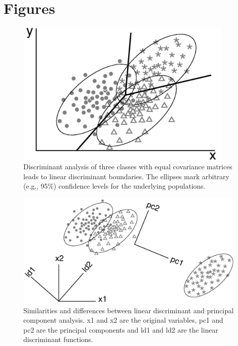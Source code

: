 \section*{Figures}

\begin{figure}[htbp]
  \centering
  \label{fig:linDisc}
  \includegraphics[width=400]{figures/discriminant.jpg}
  \caption[Linear discriminant analysis]{
Discriminant analysis of three  classes with equal covariance matrices
leads to  linear discriminant boundaries. The  ellipses mark arbitrary
(e.g., 95\%) confidence levels for the underlying populations.}
\end{figure}

\begin{figure}[htbp]
  \centering
  \includegraphics[width=600]{figures/PCAvsLDA.jpg}
  \caption[The difference between PCA and LDA]
{Similarities   and  differences   between  linear   discriminant  and
principal component  analysis.  x1 and x2 are  the original variables,
pc1  and pc2  are the  principal components  and ld1  and ld2  are the
linear discriminant functions.}
  \label{fig:PCAvsLDA}
\end{figure}

